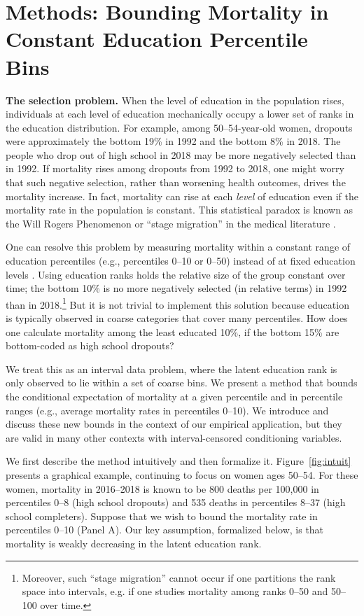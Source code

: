 \documentclass[12pt,letterpaper]{article}
\numberwithin{equation}{section}
\begin{document}
\section{Methods: Bounding Mortality in Constant Education
  Percentile Bins}
\label{sec:method}

\textbf{The selection problem.} When the level of education in the population rises, individuals at each level of education mechanically occupy a lower set of ranks in the education distribution. For example, among 50--54-year-old women, dropouts were approximately the bottom 19\% in 1992 and the bottom 8\% in 2018. The people who drop out of high school in 2018 may be more negatively selected than in 1992. If mortality rises among dropouts from 1992 to 2018, one might worry that such negative selection, rather than worsening health outcomes, drives the mortality increase. In fact, mortality can rise at each \textit{level} of education even if the mortality rate in the population is constant. This statistical paradox is known as the Will Rogers Phenomenon or ``stage migration'' in the medical literature \citep{Feinstein1985}.

One can resolve this problem by measuring mortality within a constant range of education percentiles (e.g., percentiles 0--10 or 0--50) instead of at fixed education levels \citep{Bound2015}. Using education ranks holds the relative size of the group constant over time; the bottom 10\% is no more negatively selected (in relative terms) in 1992 than in 2018.\footnote{Moreover, such ``stage migration'' cannot occur if one partitions the rank space into intervals, e.g. if one studies mortality among ranks 0--50 and 50--100 over time.} But it is not trivial to implement this solution because education is typically observed in coarse categories that cover many percentiles. How does one calculate mortality among the least educated 10\%, if the bottom 15\% are bottom-coded as high school dropouts?

We treat this as an interval data problem, where the latent education rank is only observed to lie within a set of coarse bins. We present a method that bounds the conditional expectation of mortality at a given percentile and in percentile ranges (e.g., average mortality rates in percentiles 0--10). We introduce and discuss these new bounds in the context of our empirical application, but they are valid in many other contexts with interval-censored conditioning variables.

We first describe the method intuitively and then formalize
it. Figure~\ref{fig:intuit} presents a graphical example, continuing
to focus on women ages 50--54. For these women, mortality in
2016--2018 is known to be 800 deaths per 100,000 in percentiles 0--8
(high school dropouts) and 535 deaths in percentiles 8--37 (high
school completers). Suppose that we wish to bound the mortality rate
in percentiles 0--10 (Panel A). Our key assumption, formalized below,
is that mortality is weakly decreasing in the latent education
rank. 
\end{document}
